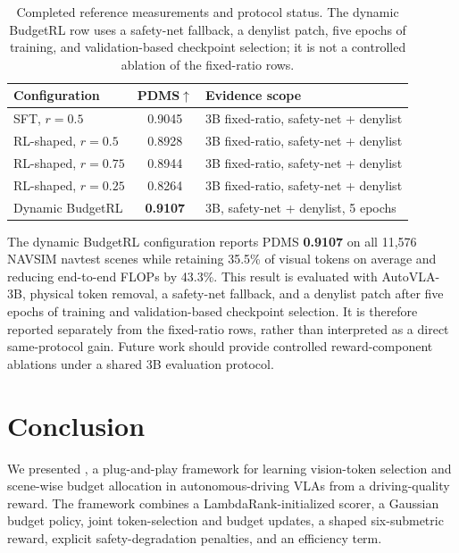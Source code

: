 \documentclass[letterpaper]{article} %
\begin{document}
\begin{table}[t]
\centering
\small
\caption{Completed reference measurements and protocol status. The
dynamic BudgetRL row uses a safety-net fallback, a denylist patch, five epochs
of training, and validation-based checkpoint selection; it is not a controlled
ablation of the fixed-ratio rows.}
\label{tab:ablation}
\setlength{\tabcolsep}{3.5pt}
\begin{tabular}{@{}lcl@{}}
\toprule
Configuration & PDMS$\uparrow$ & Evidence scope \\
\midrule
\ours{} SFT, $r{=}0.5$ & 0.9045 & 3B fixed-ratio, safety-net + denylist \\
\ours{} RL-shaped, $r{=}0.5$ & 0.8928 & 3B fixed-ratio, safety-net + denylist \\
\ours{} RL-shaped, $r{=}0.75$ & 0.8944 & 3B fixed-ratio, safety-net + denylist \\
\ours{} RL-shaped, $r{=}0.25$ & 0.8264 & 3B fixed-ratio, safety-net + denylist \\
\midrule
Dynamic BudgetRL & \textbf{0.9107} & 3B, safety-net + denylist, 5 epochs \\
\bottomrule
\end{tabular}
\end{table}

The dynamic BudgetRL configuration reports PDMS \textbf{0.9107} on all 11,576
NAVSIM navtest scenes while retaining 35.5\% of visual tokens on average and
reducing end-to-end FLOPs by 43.3\%. This result is evaluated with AutoVLA-3B,
physical token removal, a safety-net fallback, and a denylist patch after five
epochs of training and validation-based checkpoint selection. It is therefore
reported separately from the fixed-ratio rows, rather than interpreted as a
direct same-protocol gain. Future work should provide controlled reward-component
ablations under a shared 3B evaluation protocol.


\section{Conclusion}
\label{sec:concl}

We presented \ours{}, a plug-and-play framework for learning vision-token
selection and scene-wise budget allocation in autonomous-driving VLAs from a
driving-quality reward. The framework combines a LambdaRank-initialized scorer,
a Gaussian budget policy, joint token-selection and budget updates, a shaped
six-submetric reward, explicit safety-degradation penalties, and an efficiency
term.
\end{document}
